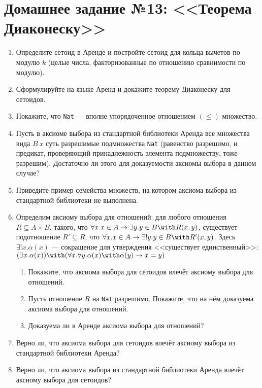 \documentclass[10pt,a4paper,oneside]{article}
\begin{document}
\section*{Домашнее задание №13: <<Теорема Диаконеску>>}
\begin{enumerate}
\item Определите сетоид в Аренде и постройте сетоид для кольца вычетов по модулю $k$ 
(целые числа, факторизованные по отношению сравнимости по модулю).
\item Сформулируйте на языке Аренд и докажите теорему Диаконеску для сетоидов.
\item Покажите, что \verb!Nat! --- вполне упорядоченное отношением $(\le)$ множество.
\item Пусть в аксиоме выбора из стандартной библиотеки Аренда все множества вида $B\ x$ суть разрешимые подмножества \verb!Nat!
(равенство разрешимо, и предикат, проверяющий принадлежность элемента подмножеству, тоже разрешим). 
Достаточно ли этого для доказуемости аксиомы выбора в данном случае?
\item Приведите пример семейства множеств, на котором аксиома выбора из стандартной библиотеки не выполнена. 
\item Определим аксиому выбора для отношений:
для любого отношения $R\subseteq A\times B$, такого, что $\forall x.x \in A \rightarrow \exists y.y \in B \with R(x,y)$,
существует подотношение $R' \subseteq R$, что $\forall x.x \in A \rightarrow \exists ! y.y \in B \with R'(x,y)$.
Здесь $\exists!x.\alpha(x)$ --- сокращение для утверждения <<существует единственный>>: 
$(\exists x.\alpha(x))\with(\forall x.\forall y.\alpha(x)\with\alpha(y)\rightarrow x=y)$
\begin{enumerate}
\item Покажите, что аксиома выбора для сетоидов влечёт аксиому выбора для отношений.
\item Пусть отношение $R$ на \verb!Nat! разрешимо. Покажите, что на нём доказуема аксиома выбора для отношений.
\item Доказуема ли в Аренде аксиома выбора для отношений?
\end{enumerate}
\item Верно ли, что аксиома выбора для сетоидов влечёт аксиому выбора из стандартной библиотеки Аренда?
\item Верно ли, что аксиома выбора из стандартной библиотеки Аренда влечёт аксиому выбора для сетоидов?
\end{enumerate}
                               
\end{document}
